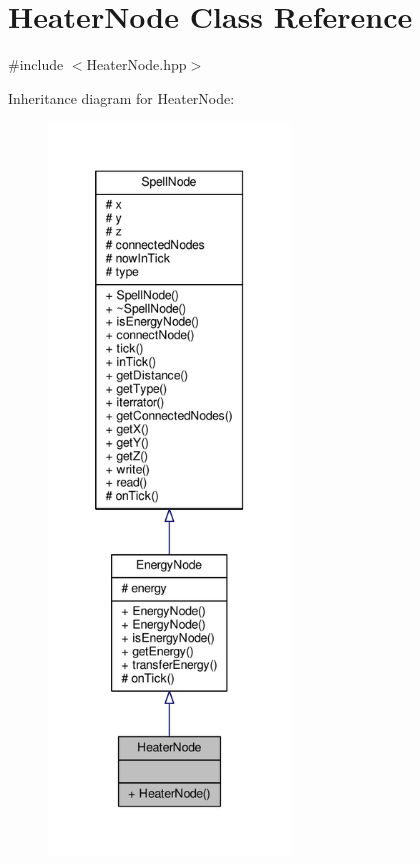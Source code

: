 \hypertarget{class_heater_node}{\section{Heater\-Node Class Reference}
\label{class_heater_node}
}


{\ttfamily \#include $<$Heater\-Node.\-hpp$>$}



Inheritance diagram for Heater\-Node\-:
\nopagebreak
\begin{figure}[H]
\begin{center}
\leavevmode
\includegraphics[height=550pt]{class_heater_node__inherit__graph}
\end{center}
\end{figure}


